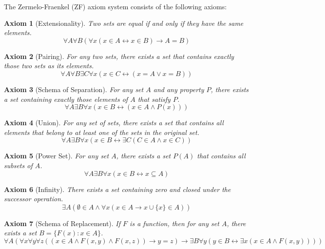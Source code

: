 \documentclass[12pt,a4paper]{article}
\newtheorem{axiom}{Axiom}
\begin{document}
The Zermelo-Fraenkel (ZF) axiom system consists of the following axioms:

\begin{axiom}[Extensionality]
Two sets are equal if and only if they have the same elements.
\[ \forall A \forall B (\forall x (x \in A \leftrightarrow x \in B) \rightarrow A = B) \]
\end{axiom}

\begin{axiom}[Pairing]
For any two sets, there exists a set that contains exactly those two sets as its elements.
\[ \forall A \forall B \exists C \forall x (x \in C \leftrightarrow (x = A \lor x = B)) \]
\end{axiom}

\begin{axiom}[Schema of Separation]
For any set $A$ and any property $P$, there exists a set containing exactly those elements of $A$ that satisfy $P$.
\[ \forall A \exists B \forall x (x \in B \leftrightarrow (x \in A \land P(x))) \]
\end{axiom}

\begin{axiom}[Union]
For any set of sets, there exists a set that contains all elements that belong to at least one of the sets in the original set.
\[ \forall A \exists B \forall x (x \in B \leftrightarrow \exists C (C \in A \land x \in C)) \]
\end{axiom}

\begin{axiom}[Power Set]
For any set $A$, there exists a set $P(A)$ that contains all subsets of $A$.
\[ \forall A \exists B \forall x (x \in B \leftrightarrow x \subseteq A) \]
\end{axiom}

\begin{axiom}[Infinity]
There exists a set containing zero and closed under the successor operation.
\[ \exists A (\emptyset \in A \land \forall x (x \in A \rightarrow x \cup \{x\} \in A)) \]
\end{axiom}

\begin{axiom}[Schema of Replacement]
If $F$ is a function, then for any set $A$, there exists a set $B = \{F(x) : x \in A\}$.
\[ \forall A (\forall x \forall y \forall z ((x \in A \land F(x,y) \land F(x,z)) \rightarrow y = z) \rightarrow \exists B \forall y (y \in B \leftrightarrow \exists x (x \in A \land F(x,y)))) \]
\end{axiom}
\end{document}
